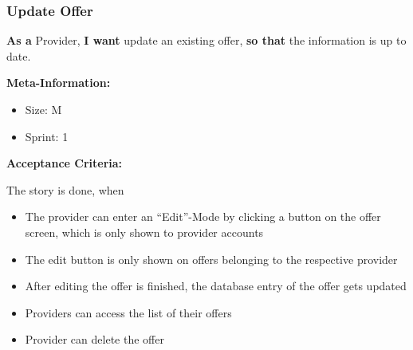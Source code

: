 \subsubsection{Update Offer}

\textbf{As a} Provider,\hfill\break
\textbf{I want} update an existing offer,\hfill\break
\textbf{so that} the information is up to date.

\textbf{Meta-Information:}
\begin{itemize}
    \item Size: M
    \item Sprint: 1
\end{itemize}

\textbf{Acceptance Criteria:}

The story is done, when
\begin{itemize}
    \item The provider can enter an “Edit”-Mode by clicking a button on the offer screen, which is only shown to provider accounts
    \item The edit button is only shown on offers belonging to the respective provider
    \item After editing the offer is finished, the database entry of the offer gets updated
    \item Providers can access the list of their offers
    \item Provider can delete the offer
\end{itemize}